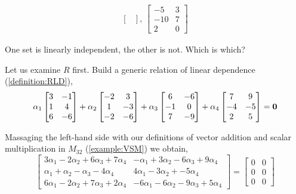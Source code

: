 \documentclass{ximera}
\begin{document}
\begin{example}
\begin{align*}
{\begin{bmatrix}
                                                       \end{bmatrix},\,
                                                                              \begin{bmatrix}
                                                                                -5 & 3\\ -10 & 7\\ 2 & 0
                                                                              \end{bmatrix}
                                                                                                       }
  \end{align*}
  
  One set is linearly independent, the other is not.  Which is which?

  Let us examine $R$ first.  Build a generic relation of linear
  dependence (\ref{definition:RLD}),
  \[
    \alpha_1\begin{bmatrix}
      3 & -1\\1 & 4\\6 & -6
    \end{bmatrix}+
    \alpha_2\begin{bmatrix}
      -2 & 3\\1 & -3\\-2 & -6
    \end{bmatrix}+
    \alpha_3\begin{bmatrix}
      6 & -6\\-1 & 0\\7 & -9
    \end{bmatrix}+
    \alpha_4\begin{bmatrix}
      7 & 9\\-4 & -5\\2 & 5
    \end{bmatrix}=
    \mathbf{0}
  \]

  Massaging the left-hand side with our definitions of vector addition and scalar multiplication in $M_{32}$ (\ref{example:VSM}) we obtain,
  \[
    \begin{bmatrix}
      3\alpha_1-2\alpha_2+6\alpha_3+7\alpha_4 &
      -\alpha_1+3\alpha_2-6\alpha_3+9\alpha_4 \\
      \alpha_1+\alpha_2-\alpha_3-4\alpha_4 &
      4\alpha_1-3\alpha_2+            -5\alpha_4 \\
      6\alpha_1-2\alpha_2+7\alpha_3+2\alpha_4 &
      -6\alpha_1-6\alpha_2-9\alpha_3+5\alpha_4
    \end{bmatrix}
    =\begin{bmatrix}
      0&0\\0&0\\0&0
    \end{bmatrix}
  \]
  

\end{example}
\end{document}
